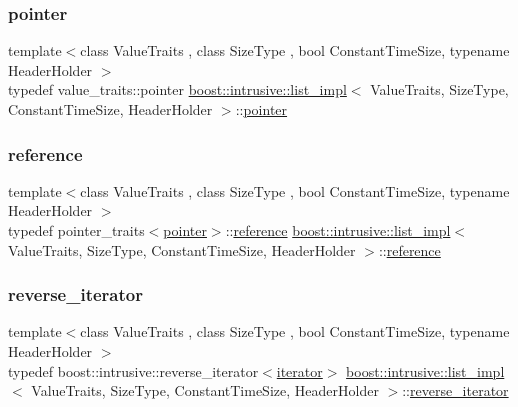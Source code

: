 \subsubsection{\texorpdfstring{pointer}{pointer}}
{\footnotesize\ttfamily template$<$class Value\+Traits , class Size\+Type , bool Constant\+Time\+Size, typename Header\+Holder $>$ \\
typedef value\+\_\+traits\+::pointer \hyperlink{classboost_1_1intrusive_1_1list__impl}{boost\+::intrusive\+::list\+\_\+impl}$<$ Value\+Traits, Size\+Type, Constant\+Time\+Size, Header\+Holder $>$\+::\hyperlink{classboost_1_1intrusive_1_1list__impl_a671027d235426ed75ab9e4b2e090afe5}{pointer}}

\mbox{\label{classboost_1_1intrusive_1_1list__impl_a881763b587dbe7c0237a552a9e89755a}} 
\subsubsection{\texorpdfstring{reference}{reference}}
{\footnotesize\ttfamily template$<$class Value\+Traits , class Size\+Type , bool Constant\+Time\+Size, typename Header\+Holder $>$ \\
typedef pointer\+\_\+traits$<$\hyperlink{classboost_1_1intrusive_1_1list__impl_a671027d235426ed75ab9e4b2e090afe5}{pointer}$>$\+::\hyperlink{classboost_1_1intrusive_1_1list__impl_a881763b587dbe7c0237a552a9e89755a}{reference} \hyperlink{classboost_1_1intrusive_1_1list__impl}{boost\+::intrusive\+::list\+\_\+impl}$<$ Value\+Traits, Size\+Type, Constant\+Time\+Size, Header\+Holder $>$\+::\hyperlink{classboost_1_1intrusive_1_1list__impl_a881763b587dbe7c0237a552a9e89755a}{reference}}

\mbox{\label{classboost_1_1intrusive_1_1list__impl_aed95b235a2056faa7d2f8cbd58dcfeb7}} 
\subsubsection{\texorpdfstring{reverse\+\_\+iterator}{reverse\_iterator}}
{\footnotesize\ttfamily template$<$class Value\+Traits , class Size\+Type , bool Constant\+Time\+Size, typename Header\+Holder $>$ \\
typedef boost\+::intrusive\+::reverse\+\_\+iterator$<$\hyperlink{classboost_1_1intrusive_1_1list__impl_a15c0189bf62eb9fb98bc07ef10b8cb23}{iterator}$>$ \hyperlink{classboost_1_1intrusive_1_1list__impl}{boost\+::intrusive\+::list\+\_\+impl}$<$ Value\+Traits, Size\+Type, Constant\+Time\+Size, Header\+Holder $>$\+::\hyperlink{classboost_1_1intrusive_1_1list__impl_aed95b235a2056faa7d2f8cbd58dcfeb7}{reverse\+\_\+iterator}}

